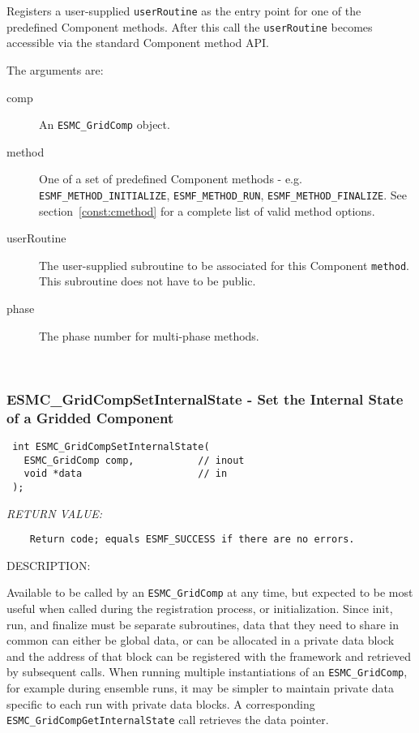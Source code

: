   
    Registers a user-supplied {\tt userRoutine} as the entry point for one of 
    the predefined Component methods. After this call the {\tt userRoutine} 
    becomes accessible via the standard Component method API.
  
    The arguments are:
    \begin{description}
    \item[comp]
      An {\tt ESMC\_GridComp} object. 
    \item[method]
    \begin{sloppypar}
      One of a set of predefined Component methods 
      - e.g. {\tt ESMF\_METHOD\_INITIALIZE}, {\tt ESMF\_METHOD\_RUN},
      {\tt ESMF\_METHOD\_FINALIZE}. See section~\ref{const:cmethod}
      for a complete list of valid method options. 
    \end{sloppypar}
    \item[userRoutine]
      The user-supplied subroutine to be associated for this Component 
      {\tt method}. This subroutine does not have to be public. 
    \item[phase]
      The phase number for multi-phase methods.
    \end{description}
   
 
\mbox{}\hrulefill\ 
 
\subsubsection [ESMC\_GridCompSetInternalState] {ESMC\_GridCompSetInternalState - Set the Internal State of a Gridded Component}


  
\begin{verbatim} int ESMC_GridCompSetInternalState(
   ESMC_GridComp comp,           // inout
   void *data                    // in
 );\end{verbatim}{\em RETURN VALUE:}
\begin{verbatim}    Return code; equals ESMF_SUCCESS if there are no errors.\end{verbatim}
{\sf DESCRIPTION:\\ }


  
    Available to be called by an {\tt ESMC\_GridComp} at any time, but
    expected to be most useful when called during the registration process, 
    or initialization. Since init, run, and finalize must be separate
    subroutines, data that they need to share in common can either be global
    data, or can be allocated in a private data block and the address of that 
    block can be registered with the framework and retrieved by subsequent
    calls.
    When running multiple instantiations of an {\tt ESMC\_GridComp}, 
    for example during ensemble runs, it may be simpler to maintain private 
    data specific to each run with private data blocks.  A corresponding 
    {\tt ESMC\_GridCompGetInternalState} call retrieves the data pointer.
     
